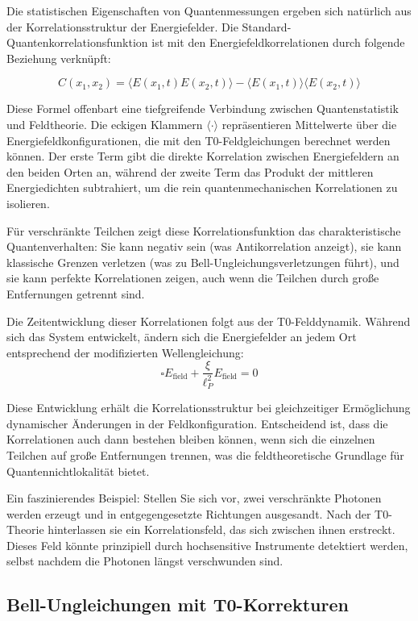 \documentclass[12pt,a4paper]{article}
\newcommand{\xipar}{\xi}
\theoremstyle{definition}
\theoremstyle{remark}
\begin{document}
Die statistischen Eigenschaften von Quantenmessungen ergeben sich natürlich aus der Korrelationsstruktur der Energiefelder. Die Standard-Quantenkorrelationsfunktion ist mit den Energiefeldkorrelationen durch folgende Beziehung verknüpft:

\begin{equation}
	C(x_1,x_2) = \langle E(x_1,t) E(x_2,t) \rangle - \langle E(x_1,t) \rangle \langle E(x_2,t) \rangle
	\label{eq:field_correlation_function}
\end{equation}

Diese Formel offenbart eine tiefgreifende Verbindung zwischen Quantenstatistik und Feldtheorie. Die eckigen Klammern $\langle \cdot \rangle$ repräsentieren Mittelwerte über die Energiefeldkonfigurationen, die mit den T0-Feldgleichungen berechnet werden können. Der erste Term gibt die direkte Korrelation zwischen Energiefeldern an den beiden Orten an, während der zweite Term das Produkt der mittleren Energiedichten subtrahiert, um die rein quantenmechanischen Korrelationen zu isolieren.

Für verschränkte Teilchen zeigt diese Korrelationsfunktion das charakteristische Quantenverhalten: Sie kann negativ sein (was Antikorrelation anzeigt), sie kann klassische Grenzen verletzen (was zu Bell-Ungleichungsverletzungen führt), und sie kann perfekte Korrelationen zeigen, auch wenn die Teilchen durch große Entfernungen getrennt sind.

Die Zeitentwicklung dieser Korrelationen folgt aus der T0-Felddynamik. Während sich das System entwickelt, ändern sich die Energiefelder an jedem Ort entsprechend der modifizierten Wellengleichung:
$$\square E_{\text{field}} + \frac{\xipar}{\ell_P^2} E_{\text{field}} = 0$$

Diese Entwicklung erhält die Korrelationsstruktur bei gleichzeitiger Ermöglichung dynamischer Änderungen in der Feldkonfiguration. Entscheidend ist, dass die Korrelationen auch dann bestehen bleiben können, wenn sich die einzelnen Teilchen auf große Entfernungen trennen, was die feldtheoretische Grundlage für Quantennichtlokalität bietet.

Ein faszinierendes Beispiel: Stellen Sie sich vor, zwei verschränkte Photonen werden erzeugt und in entgegengesetzte Richtungen ausgesandt. Nach der T0-Theorie hinterlassen sie ein Korrelationsfeld, das sich zwischen ihnen erstreckt. Dieses Feld könnte prinzipiell durch hochsensitive Instrumente detektiert werden, selbst nachdem die Photonen längst verschwunden sind.

\subsection{Bell-Ungleichungen mit T0-Korrekturen}
\end{document}
